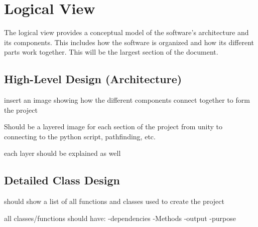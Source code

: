 \section{Logical View}

The logical view provides a conceptual model of the software's architecture and its components. 
This includes how the software is organized and how its different parts work together.
This will be the largest section of the document.

\subsection{High-Level Design (Architecture)}

insert an image showing how the different components connect together to form the project

Should be a layered image for each section of the project from unity to connecting to the python script, pathfinding, etc.

each layer should be explained as well

\subsection{Detailed Class Design}

should show a list of all functions and classes used to create the project

all classes/functions should have:
-dependencies
-Methods
-output
-purpose